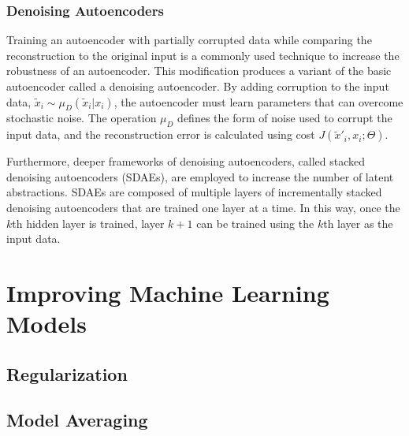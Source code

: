 \subsubsection{Denoising Autoencoders}
Training an autoencoder with partially corrupted data while comparing the reconstruction to the original input is a commonly used technique to increase the robustness of an autoencoder. This modification produces a variant of the basic autoencoder called a denoising autoencoder. By adding corruption to the input data, $\tilde{x}_{i} \sim \mu_{D}(\tilde{x}_{i}|x_{i})$, the autoencoder must learn parameters that can overcome stochastic noise. The operation $\mu_{D}$ defines the form of noise used to corrupt the input data, and the reconstruction error is calculated using cost $J(\tilde{x}'_{i},x_{i};\Theta)$. 

Furthermore, deeper frameworks of denoising autoencoders, called stacked denoising autoencoders (SDAEs), are employed to increase the number of latent abstractions. SDAEs are composed of multiple layers of incrementally stacked denoising autoencoders that are trained one layer at a time. In this way, once the $k$th hidden layer is trained, layer $k+1$ can be trained using the $k$th layer as the input data.



\section{Improving Machine Learning Models}

\subsection{Regularization}

\subsection{Model Averaging}





